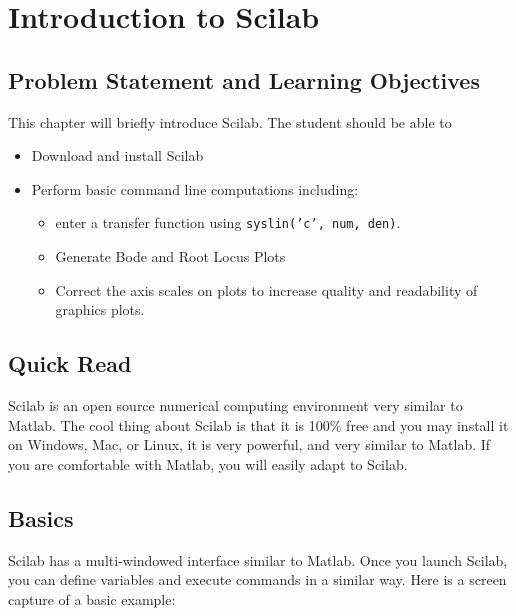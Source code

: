 %
%
%

\chapter{Introduction to Scilab}

\section{Problem Statement and Learning Objectives}

This chapter will briefly introduce Scilab.  The student should be able to 
\begin{itemize}
    \item Download and install Scilab
    \item Perform basic command line computations including:
    \begin{itemize}
        \item enter a transfer function using {\tt syslin('c', num, den)}.
        \item Generate Bode and Root Locus Plots
        \item Correct the axis scales on plots to increase quality and readability of 
        graphics plots. 
    \end{itemize}
\end{itemize}


\section{Quick Read}
Scilab is an open source numerical computing environment very similar to Matlab.  The cool thing
 about Scilab is that it is 100\% free and you may install it on Windows, Mac, or Linux, it is very powerful, 
 and very similar to Matlab.   If you are comfortable with Matlab, you will easily adapt to Scilab. 

\section{Basics}
Scilab has a multi-windowed interface similar to Matlab.  Once you launch Scilab, you can define variables and 
execute commands in a similar way.  Here is a screen capture of a basic example:

